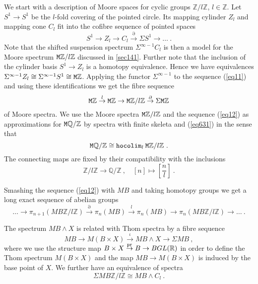 \documentclass[12pt]{article}
\newcommand{\hocolim}{{\tt hocolim}}
\newcommand{\Z}{{\mathbb{Z}}}
\newcommand{\Q}{{\mathbb{Q}}}
\newcommand{\R}{{\mathbb{R}}}
\newcommand{\tM}{{\tt M}}
\newcommand{\pr}{{\tt pr}}
\begin{document}
 
 
We start with a description of Moore spaces for cyclic groups $\Z/l\Z$, $l\in \Z$. 
Let $S^{1}\to S^{1}$ be the $l$-fold covering of the pointed circle.
Its mapping cylinder $Z_{l}$ and mapping cone $C_{l}$ fit into the cofibre sequence of pointed spaces
\begin{equation}\label{eq11}S^{1}\to Z_{l}\to C_{l}\stackrel{\partial}{\to} \Sigma S^{1}\to \dots\ .\end{equation}
Note that the shifted suspension spectrum $\Sigma^{\infty-1}C_{l}$ is then a model for the Moore spectrum
$\tM \Z/l\Z$  discussed in \ref{sec141}. Further note that the inclusion of the cylinder basis $S^{1}\to Z_{l}$ is a homotopy equivalence. Hence  we have equivalences
$\Sigma^{\infty-1}Z_{l}\cong  \Sigma^{\infty-1}S^{1}\cong \tM\Z$.
Applying the functor $\Sigma^{\infty-1}$ to the sequence (\ref{eq11}) and using these identifications we get
the fibre sequence
\begin{equation}\label{eq12}\tM\Z\stackrel{l}{\to} \tM\Z \to \tM \Z/l\Z\stackrel{\partial}{\to}\Sigma \tM\Z\end{equation}
of Moore spectra.
We use the Moore spectra $\tM\Z/l\Z$ and the sequence (\ref{eq12}) as approximations for
$\tM\Q/\Z$  by spectra with finite skeleta and (\ref{eq631}) in the sense that
$$\tM \Q/\Z\cong \hocolim_{l} \:\tM \Z/l\Z\ .$$
The connecting maps are fixed by their compatibility with the inclusions \begin{equation}\label{eq4333}\Z/l\Z\to \Q/\Z\ ,\quad [n]\mapsto [\frac{n}{l}]\ .\end{equation}






Smashing the sequence (\ref{eq12}) with $MB$ and taking homotopy groups we get a long exact sequence of abelian groups
\begin{equation}\label{eq14}\dots\to\pi_{n+1}(MB\Z/l\Z)\stackrel{\partial}{\to} \pi_{n}(MB)\stackrel{l}{\to}\pi_{n}(MB)\to\pi_{n}(MB\Z/l\Z)\to\dots\ .\end{equation}

 The spectrum $MB\wedge X$ is related with Thom spectra by 
a fibre sequence
$$MB\to M(B\times X) \stackrel{\iota}{\to} MB\wedge X\to \Sigma MB\ ,$$
where we use the structure map
$B\times X\stackrel{\pr}{\to} B\to BGL(\R)$ in order to define the Thom spectrum
$M(B\times X)$ and the map
$MB\to M(B\times X)$ is induced by the base point of $X$. We further have
an equivalence   of spectra
\begin{equation}\label{eq13}\Sigma MB\Z/l\Z\cong  MB\wedge C_{l}\ .\end{equation}
 
\end{document}
